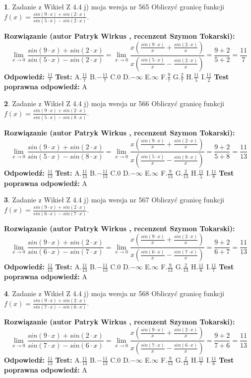 \documentclass[12pt, a4paper]{article}
\theoremstyle{definition} %
\newtheorem{zad}{}
\newcommand{\zadStart}[1]{\begin{zad}#1\newline}
\newcommand{\zadStop}{\end{zad}}
\newcommand{\rozwStart}[2]{\noindent \textbf{Rozwiązanie (autor #1 , recenzent #2): }\newline}
\newcommand{\rozwStop}{\newline}
\newcommand{\odpStart}{\noindent \textbf{Odpowiedź:}\newline}
\newcommand{\odpStop}{\newline}
\newcommand{\testStart}{\noindent \textbf{Test:}\newline}
\newcommand{\testStop}{\newline}
\newcommand{\kluczStart}{\noindent \textbf{Test poprawna odpowiedź:}\newline}
\newcommand{\kluczStop}{\newline}
\begin{document}
\zadStart{Zadanie z Wikieł Z 4.4 j) moja wersja nr 565}
Obliczyć granicę funkcji $f(x)=\frac{sin(9\cdot x) +sin(2\cdot x)}{sin(5\cdot x) -sin(2\cdot x)}$.
\zadStop
\rozwStart{Patryk Wirkus}{Szymon Tokarski}
$$\lim\limits_{x\to 0}\frac{sin(9\cdot x) +sin(2\cdot x)}{sin(5\cdot x) -sin(2\cdot x)}=\lim\limits_{x\to 0}\frac{x(\frac{sin(9\cdot x)}{x}+\frac{sin(2\cdot x)}{x})}{x(\frac{sin(5\cdot x)}{x}-\frac{sin(2\cdot x)}{x})}=\frac{9+2}{5+2} = \frac{11}{7}$$
\rozwStop
\odpStart
$\frac{11}{7}$
\odpStop
\testStart
A.$\frac{11}{7}$
B.$-\frac{11}{7}$
C.$0$
D.$-\infty$
E.$\infty$
F.$\frac{9}{7}$
G.$\frac{2}{7}$
H.$\frac{11}{5}$
I.$\frac{11}{2}$
\testStop
\kluczStart
A
\kluczStop



\zadStart{Zadanie z Wikieł Z 4.4 j) moja wersja nr 566}
Obliczyć granicę funkcji $f(x)=\frac{sin(9\cdot x) +sin(2\cdot x)}{sin(5\cdot x) -sin(8\cdot x)}$.
\zadStop
\rozwStart{Patryk Wirkus}{Szymon Tokarski}
$$\lim\limits_{x\to 0}\frac{sin(9\cdot x) +sin(2\cdot x)}{sin(5\cdot x) -sin(8\cdot x)}=\lim\limits_{x\to 0}\frac{x(\frac{sin(9\cdot x)}{x}+\frac{sin(2\cdot x)}{x})}{x(\frac{sin(5\cdot x)}{x}-\frac{sin(8\cdot x)}{x})}=\frac{9+2}{5+8} = \frac{11}{13}$$
\rozwStop
\odpStart
$\frac{11}{13}$
\odpStop
\testStart
A.$\frac{11}{13}$
B.$-\frac{11}{13}$
C.$0$
D.$-\infty$
E.$\infty$
F.$\frac{9}{13}$
G.$\frac{2}{13}$
H.$\frac{11}{5}$
I.$\frac{11}{8}$
\testStop
\kluczStart
A
\kluczStop



\zadStart{Zadanie z Wikieł Z 4.4 j) moja wersja nr 567}
Obliczyć granicę funkcji $f(x)=\frac{sin(9\cdot x) +sin(2\cdot x)}{sin(6\cdot x) -sin(7\cdot x)}$.
\zadStop
\rozwStart{Patryk Wirkus}{Szymon Tokarski}
$$\lim\limits_{x\to 0}\frac{sin(9\cdot x) +sin(2\cdot x)}{sin(6\cdot x) -sin(7\cdot x)}=\lim\limits_{x\to 0}\frac{x(\frac{sin(9\cdot x)}{x}+\frac{sin(2\cdot x)}{x})}{x(\frac{sin(6\cdot x)}{x}-\frac{sin(7\cdot x)}{x})}=\frac{9+2}{6+7} = \frac{11}{13}$$
\rozwStop
\odpStart
$\frac{11}{13}$
\odpStop
\testStart
A.$\frac{11}{13}$
B.$-\frac{11}{13}$
C.$0$
D.$-\infty$
E.$\infty$
F.$\frac{9}{13}$
G.$\frac{2}{13}$
H.$\frac{11}{6}$
I.$\frac{11}{7}$
\testStop
\kluczStart
A
\kluczStop



\zadStart{Zadanie z Wikieł Z 4.4 j) moja wersja nr 568}
Obliczyć granicę funkcji $f(x)=\frac{sin(9\cdot x) +sin(2\cdot x)}{sin(7\cdot x) -sin(6\cdot x)}$.
\zadStop
\rozwStart{Patryk Wirkus}{Szymon Tokarski}
$$\lim\limits_{x\to 0}\frac{sin(9\cdot x) +sin(2\cdot x)}{sin(7\cdot x) -sin(6\cdot x)}=\lim\limits_{x\to 0}\frac{x(\frac{sin(9\cdot x)}{x}+\frac{sin(2\cdot x)}{x})}{x(\frac{sin(7\cdot x)}{x}-\frac{sin(6\cdot x)}{x})}=\frac{9+2}{7+6} = \frac{11}{13}$$
\rozwStop
\odpStart
$\frac{11}{13}$
\odpStop
\testStart
A.$\frac{11}{13}$
B.$-\frac{11}{13}$
C.$0$
D.$-\infty$
E.$\infty$
F.$\frac{9}{13}$
G.$\frac{2}{13}$
H.$\frac{11}{7}$
I.$\frac{11}{6}$
\testStop
\kluczStart
A
\kluczStop
\end{document}
